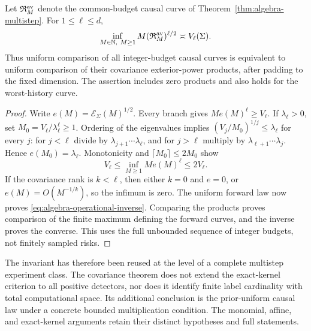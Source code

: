 \begin{corollary}
\label{cor:algebra-operational-inverse}
Let $\mathfrak R_M^{\rm av}$ denote the common-budget causal curve of
Theorem~\ref{thm:algebra-multistep}. For $1\le\ell\le d$,
\begin{equation}\label{eq:algebra-operational-inverse}
 \inf_{M\in\mathbb N,\ M\ge1}M(\mathfrak R_M^{\rm av})^{\ell/2}
                         \asymp V_\ell(\Sigma).
\end{equation}
Thus uniform comparison of all integer-budget causal curves is
equivalent to uniform comparison of their covariance exterior-power
products, after padding to the fixed dimension. The assertion includes
zero products and also holds for the worst-history curve.
\end{corollary}
\begin{proof}
Write $e(M)=\mathcal E_\Sigma(M)^{1/2}$. Every branch gives
$Me(M)^\ell\ge V_\ell$. If $\lambda_\ell>0$, set
$M_0=V_\ell/\lambda_\ell^\ell\ge1$. Ordering of the eigenvalues
implies $(V_j/M_0)^{1/j}\le\lambda_\ell$ for every $j$:
for $j<\ell$ divide by $\lambda_{j+1}\cdots\lambda_\ell$, and
for $j>\ell$ multiply by $\lambda_{\ell+1}\cdots\lambda_j$.
Hence $e(M_0)=\lambda_\ell$. Monotonicity and
$\lceil M_0\rceil\le2M_0$ show
\[
 V_\ell\le\inf_{M\ge1}Me(M)^\ell\le2V_\ell.
\]
If the covariance rank is $k<\ell$, then either $k=0$ and $e=0$,
or $e(M)=O(M^{-1/k})$, so the infimum is zero. The uniform forward
law now proves \eqref{eq:algebra-operational-inverse}. Comparing the
products proves comparison of the finite maximum defining the forward
curves, and the inverse proves the converse. This uses the full
unbounded sequence of integer budgets, not finitely sampled risks.
\end{proof}

The invariant has therefore been reused at the level of a complete
multistep experiment class. The covariance theorem does not extend the
exact-kernel criterion to all positive detectors, nor does it identify
finite label cardinality with total computational space. Its additional
conclusion is the prior-uniform causal law under a concrete bounded
multiplication condition. The monomial, affine, and exact-kernel
arguments retain their distinct hypotheses and full statements.
